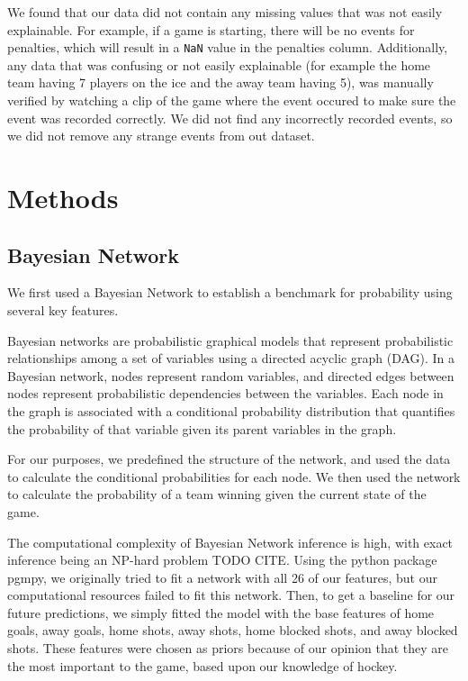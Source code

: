 \documentclass[11pt]{article}
\begin{document}
We found that our data did not contain any missing values that was not easily explainable. For example, if a game is starting, there will be no
events for penalties, which will result in a {\tt NaN} value in the penalties column. Additionally, any data that was confusing or not easily explainable
(for example the home team having 7 players on the ice and the away team having 5), was manually verified by watching a clip of the game where
the event occured to make sure the event was recorded correctly. We did not find any incorrectly recorded events, so we 
did not remove any strange events from out dataset.

\section{Methods}

\subsection{Bayesian Network}
We first used a Bayesian Network to establish a benchmark for probability using several key features.

Bayesian networks are probabilistic graphical models that represent probabilistic relationships among a set of variables using a directed acyclic graph (DAG). 
In a Bayesian network, nodes represent random variables, and directed edges between nodes represent probabilistic dependencies between the variables. Each node in the graph is associated with a conditional probability distribution that quantifies the probability of that variable given its parent variables in the graph.

For our purposes, we predefined the structure of the network, and used the data to calculate the conditional probabilities for each node. We then used the network to calculate the probability of a team winning given the current state of the game.

The computational complexity of Bayesian Network inference is high, with exact inference being an NP-hard problem TODO CITE. 
Using the python package pgmpy, we originally tried to fit a network with all 26 of our features, but our computational resources failed to fit this network.
Then, to get a baseline for our future predictions, we simply fitted the model with the base features of home goals, away goals, home shots, away shots, home blocked shots, and away blocked shots. 
These features were chosen as priors because of our opinion that they are the most important to the game, based upon our knowledge of hockey.
\end{document}
